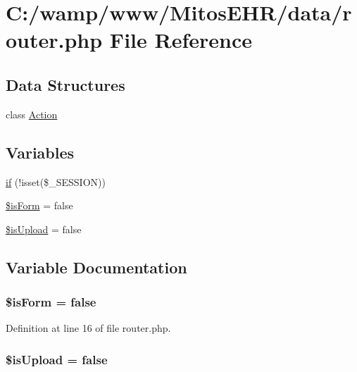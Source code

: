 \hypertarget{router_8php}{\section{\-C\-:/wamp/www/\-Mitos\-E\-H\-R/data/router.php \-File \-Reference}
\label{router_8php}
}
\subsection*{\-Data \-Structures}
\begin{DoxyCompactItemize}
\item 
class \hyperlink{class_action}{\-Action}
\end{DoxyCompactItemize}
\subsection*{\-Variables}
\begin{DoxyCompactItemize}
\item 
\hyperlink{router_8php_a8ceca98aa29914fd2479a84a8d2242fb}{if} (!isset(\$\-\_\-\-S\-E\-S\-S\-I\-O\-N))
\item 
\hyperlink{router_8php_a8f7fd6f53895361b8f6f9f62f4d473fa}{\$is\-Form} = false
\item 
\hyperlink{router_8php_a49dced87222d28d3a93aca592d715765}{\$is\-Upload} = false
\end{DoxyCompactItemize}


\subsection{\-Variable \-Documentation}
\hypertarget{router_8php_a8f7fd6f53895361b8f6f9f62f4d473fa}{
\subsubsection[{\$is\-Form}]{\setlength{\rightskip}{0pt plus 5cm}\$is\-Form = false}}\label{router_8php_a8f7fd6f53895361b8f6f9f62f4d473fa}


\-Definition at line 16 of file router.\-php.

\hypertarget{router_8php_a49dced87222d28d3a93aca592d715765}{
\subsubsection[{\$is\-Upload}]{\setlength{\rightskip}{0pt plus 5cm}\$is\-Upload = false}}\label{router_8php_a49dced87222d28d3a93aca592d715765}


